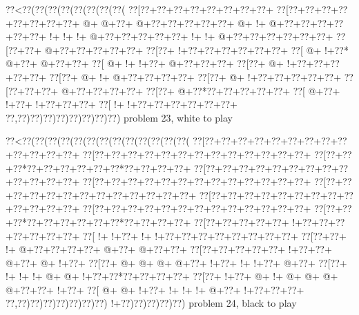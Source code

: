 \vbox{\vbox{\goo
\0??<\0??(\0??(\0??(\0??(\0??(\0??(\0??(\0??(
\0??[\0??+\0??+\0??+\0??+\0??+\0??+\0??+\0??+
\0??[\0??+\0??+\0??+\0??+\0??+\0??+\0??+\0??+
\- @+\- @+\0??+\- @+\0??+\0??+\0??+\0??+\0??+
\- @+\- !+\- @+\0??+\0??+\0??+\0??+\0??+\0??+
\- !+\- !+\- !+\- @+\0??+\0??+\0??+\0??+\0??+
\- !+\- !+\- @+\0??+\0??+\0??+\0??+\0??+\0??+
\0??[\0??+\0??+\- @+\0??+\0??+\0??+\0??+\0??+
\0??[\0??+\- !+\0??+\0??+\0??+\0??+\0??+\0??+
\0??[\- @+\- !+\0??*\- @+\0??+\- @+\0??+\0??+
\0??[\- @+\- !+\- !+\0??+\- @+\0??+\0??+\0??+
\0??[\0??+\- @+\- !+\0??+\0??+\0??+\0??+\0??+
\0??[\0??+\- @+\- !+\- @+\0??+\0??+\0??+\0??+
\0??[\0??+\- @+\- !+\0??+\0??+\0??+\0??+\0??+
\0??[\0??+\0??+\0??+\- @+\0??+\0??+\0??+\0??+
\0??[\0??+\- @+\0??*\0??+\0??+\0??+\0??+\0??+
\0??[\- @+\0??+\- !+\0??+\- !+\0??+\0??+\0??+
\0??[\- !+\- !+\0??+\0??+\0??+\0??+\0??+\0??+
\0??,\0??)\0??)\0??)\0??)\0??)\0??)\0??)\0??)
}
\hfil problem 23, white to play\hfil\break
}

\vbox{\vbox{\goo
\0??<\0??(\0??(\0??(\0??(\0??(\0??(\0??(\0??(\0??(\0??(\0??(\0??(\0??(
\0??[\0??+\0??+\0??+\0??+\0??+\0??+\0??+\0??+\0??+\0??+\0??+\0??+\0??+
\0??[\0??+\0??+\0??+\0??+\0??+\0??+\0??+\0??+\0??+\0??+\0??+\0??+\0??+
\0??[\0??+\0??+\0??*\0??+\0??+\0??+\0??+\0??+\0??*\0??+\0??+\0??+\0??+
\0??[\0??+\0??+\0??+\0??+\0??+\0??+\0??+\0??+\0??+\0??+\0??+\0??+\0??+
\0??[\0??+\0??+\0??+\0??+\0??+\0??+\0??+\0??+\0??+\0??+\0??+\0??+\0??+
\0??[\0??+\0??+\0??+\0??+\0??+\0??+\0??+\0??+\0??+\0??+\0??+\0??+\0??+
\0??[\0??+\0??+\0??+\0??+\0??+\0??+\0??+\0??+\0??+\0??+\0??+\0??+\0??+
\0??[\0??+\0??+\0??+\0??+\0??+\0??+\0??+\0??+\0??+\0??+\0??+\0??+\0??+
\0??[\0??+\0??+\0??*\0??+\0??+\0??+\0??+\0??+\0??*\0??+\0??+\0??+\0??+
\0??[\0??+\0??+\0??+\0??+\0??+\- !+\0??+\0??+\0??+\0??+\0??+\0??+\0??+
\0??[\- !+\- !+\0??+\- !+\- !+\0??+\0??+\0??+\0??+\0??+\0??+\0??+\0??+
\0??[\0??+\0??+\- !+\- @+\0??+\0??+\0??+\0??+\- @+\0??+\- @+\0??+\0??+
\0??[\0??+\0??+\0??+\0??+\0??+\- !+\0??+\0??+\- @+\0??+\- @+\- !+\0??+
\0??[\0??+\- @+\- @+\- @+\- @+\0??+\- !+\0??+\- !+\- !+\0??+\- @+\0??+
\0??[\0??+\- !+\- !+\- !+\- @+\- @+\- !+\0??+\0??*\0??+\0??+\0??+\0??+
\0??[\0??+\- !+\0??+\- @+\- !+\- @+\- @+\- @+\- @+\0??+\0??+\- !+\0??+
\0??[\- @+\- @+\- !+\0??+\- !+\- !+\- !+\- @+\0??+\- !+\0??+\0??+\0??+
\0??,\0??)\0??)\0??)\0??)\0??)\0??)\0??)\- !+\0??)\0??)\0??)\0??)\0??)
}
\hfil problem 24, black to play\hfil\break
}

